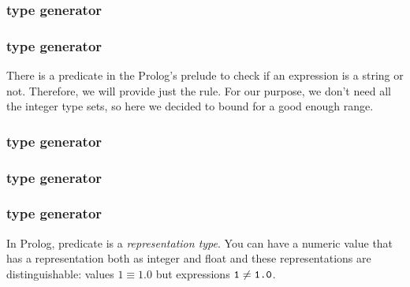 \subsubsection{ type generator}

\subsubsection{ type generator}
There is a predicate  in the Prolog's prelude to check if an expression is a string or not. Therefore, we will provide just the  rule. For our purpose, we don't need all the integer type sets, so here we decided to bound for a good enough range.

\subsubsection{ type generator}

\subsubsection{ type generator}

\subsubsection{ type generator}
In Prolog,  predicate is a \textit{representation type}. You can have a numeric value that has a representation both as integer and float and these representations are distinguishable: values $1 \equiv 1.0$ but expressions $\texttt{1} \neq \texttt{1.0}$.

